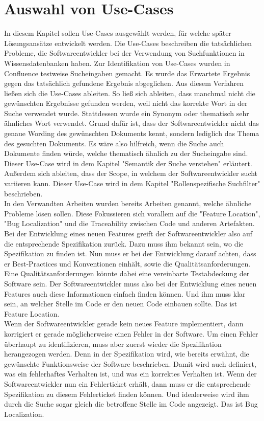 \chapter{Auswahl von Use-Cases}

In diesem Kapitel sollen Use-Cases ausgewählt werden, für welche später Lösungsansätze entwickelt werden.
Die Use-Cases beschreiben die tatsächlichen Probleme, die Softwareentwickler bei der Verwendung von Suchfunktionen in Wissensdatenbanken haben.
Zur Identifikation von Use-Cases wurden in Confluence testweise Sucheingaben gemacht.
Es wurde das Erwartete Ergebnis gegen das tatsächlich gefundene Ergebnis abgeglichen.
Aus diesem Verfahren ließen sich die Use-Cases ableiten.
So ließ sich ableiten, dass manchmal nicht die gewünschten Ergebnisse gefunden werden, weil nicht das korrekte Wort in der Suche verwendet wurde.
Stattdessen wurde ein Synonym oder thematisch sehr ähnliches Wort verwendet.
Grund dafür ist, dass der Softwareentwickler nicht das genaue Wording des gewünschten Dokuments kennt, sondern lediglich das Thema des gesuchten Dokuments.
Es wäre also hilfreich, wenn die Suche auch Dokumente finden würde, welche thematisch ähnlich zu der Sucheingabe sind.
Dieser Use-Case wird in dem Kapitel "Semantik der Suche verstehen" erläutert.
Außerdem sich ableiten, dass der Scope, in welchem der Softwareentwickler sucht variieren kann.
Dieser Use-Case wird in dem Kapitel "Rollenspezifische Suchfilter" beschrieben.\\

In den Verwandten Arbeiten wurden bereits Arbeiten genannt, welche ähnliche Probleme lösen sollen.
Diese Fokussieren sich vorallem auf die "Feature Location", "Bug Localization" und die Traceability zwischen Code und anderen Artefakten.
Bei der Entwicklung eines neuen Features greift der Softwareentwickler also auf die entsprechende Spezifikation zurück.
Dazu muss ihm bekannt sein, wo die Spezifikation zu finden ist.
Nun muss er bei der Entwicklung darauf achten, dass er Best-Practices und Konventionen einhält, sowie die Qualitätsanforderungen.
Eine Qualitätsanforderungen könnte dabei eine vereinbarte Testabdeckung der Software sein.
Der Softwareentwickler muss also bei der Entwicklung eines neuen Features auch diese Informationen einfach finden können.
Und ihm muss klar sein, an welcher Stelle im Code er den neuen Code einbauen sollte.
Das ist Feature Location.\\

Wenn der Softwareentwickler gerade kein neues Feature implementiert, dann korrigiert er gerade möglicherweise einen Fehler in der Software.
Um einen Fehler überhaupt zu identifizieren, muss aber zuerst wieder die Spezifikation herangezogen werden.
Denn in der Spezifikation wird, wie bereits erwähnt, die gewünschte Funktionsweise der Software beschrieben.
Damit wird auch definiert, was ein fehlerhaftes Verhalten ist, und was ein korrektes Verhalten ist.
Wenn der Softwareentwickler nun ein Fehlerticket erhält, dann muss er die entsprechende Spezifikation zu diesem Fehlerticket finden können.
Und idealerweise wird ihm durch die Suche sogar gleich die betroffene Stelle im Code angezeigt.
Das ist Bug Localization.

